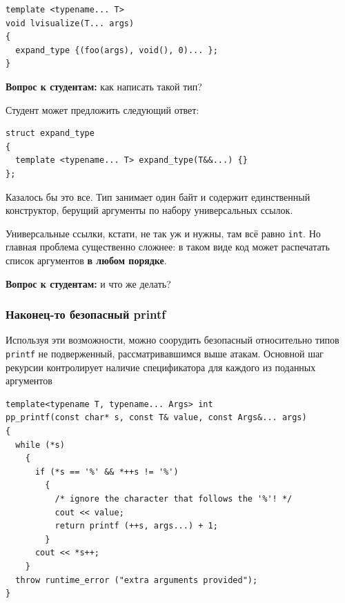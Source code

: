 \documentclass[a4paper,12pt,oneside]{article}
\newif\ifanswers
\begin{document}
\begin{lstlisting}
template <typename... T>
void lvisualize(T... args)
{
  expand_type {(foo(args), void(), 0)... };
}
\end{lstlisting}

\textbf{Вопрос к студентам:} как написать такой тип?

\ifanswers
Правильный ответ: см. далее
\fi

Студент может предложить следующий ответ:

\begin{lstlisting}
struct expand_type
{
  template <typename... T> expand_type(T&&...) {}
};
\end{lstlisting}

Казалось бы это все. Тип занимает один байт и содержит единственный конструктор, берущий аргументы по набору универсальных ссылок.

Универсальные ссылки, кстати, не так уж и нужны, там всё равно \lstinline!int!. Но главная проблема существенно сложнее: в таком виде код может распечатать список аргументов \textbf{в любом порядке}.

\textbf{Вопрос к студентам:} и что же делать?

\ifanswers
Правильный ответ: вспомнить про синтаксис инициализации и сделать его правильно.

\begin{lstlisting}
struct expand_type
{
  expand_type(std::initializer_list<int>) {}
};
\end{lstlisting}
\fi

\subsubsection{Наконец-то безопасный printf}\label{TypesafePrintf}

Используя эти возможности, можно соорудить безопасный относительно типов \lstinline!printf! не подверженный, рассматривавшимся выше атакам. Основной шаг рекурсии контролирует наличие спецификатора для каждого из поданных аргументов

\begin{lstlisting}
template<typename T, typename... Args> int
pp_printf(const char* s, const T& value, const Args&... args)
{
  while (*s)
    {
      if (*s == '%' && *++s != '%')
        {
          /* ignore the character that follows the '%'! */
          cout << value;
          return printf (++s, args...) + 1;
        }
      cout << *s++;
    }
  throw runtime_error ("extra arguments provided");
}
\end{lstlisting}
\end{document}
